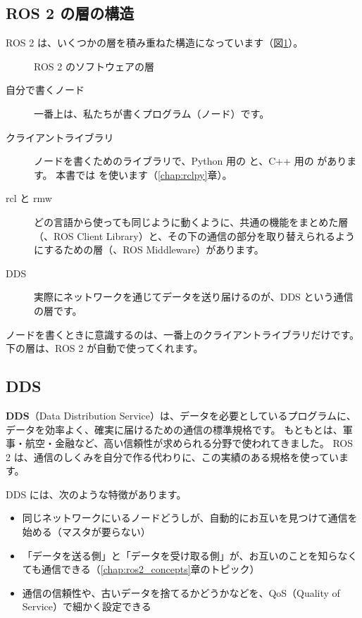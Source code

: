 \subsection{ROS 2 の層の構造}

ROS 2 は、いくつかの層を積み重ねた構造になっています（図\ref{fig:what-is-ros-architecture}）。

\begin{figure}[tb]
  \centering
  
  \caption{ROS 2 のソフトウェアの層}
  \label{fig:what-is-ros-architecture}
\end{figure}

\begin{description}
  \item[自分で書くノード]
    一番上は、私たちが書くプログラム（ノード）です。
  \item[クライアントライブラリ]
    ノードを書くためのライブラリで、Python 用の  と、C++ 用の  があります。
    本書では  を使います（\ref{chap:rclpy}章）。
  \item[rcl と rmw]
    どの言語から使っても同じように動くように、共通の機能をまとめた層（、ROS Client Library）と、その下の通信の部分を取り替えられるようにするための層（、ROS Middleware）があります。
  \item[DDS]
    実際にネットワークを通じてデータを送り届けるのが、DDS という通信の層です。
\end{description}

ノードを書くときに意識するのは、一番上のクライアントライブラリだけです。
下の層は、ROS 2 が自動で使ってくれます。

\subsection{DDS}

\textbf{DDS}（Data Distribution Service）は、データを必要としているプログラムに、データを効率よく、確実に届けるための通信の標準規格です。
もともとは、軍事・航空・金融など、高い信頼性が求められる分野で使われてきました。
ROS 2 は、通信のしくみを自分で作る代わりに、この実績のある規格を使っています。

DDS には、次のような特徴があります。

\begin{itemize}
  \item 同じネットワークにいるノードどうしが、自動的にお互いを見つけて通信を始める（マスタが要らない）
  \item 「データを送る側」と「データを受け取る側」が、お互いのことを知らなくても通信できる（\ref{chap:ros2_concepts}章のトピック）
  \item 通信の信頼性や、古いデータを捨てるかどうかなどを、QoS（Quality of Service）で細かく設定できる
\end{itemize}

